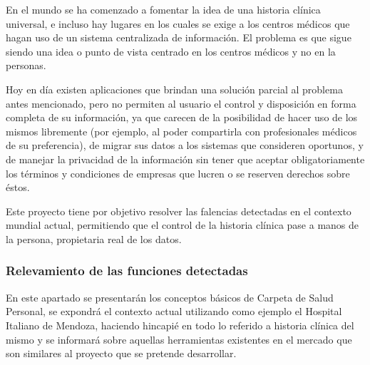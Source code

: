 En el mundo se ha comenzado a fomentar la idea de una historia clínica universal, e incluso hay lugares en los cuales se exige a los centros médicos que hagan uso de un sistema centralizada de  información.
El problema es que sigue siendo una idea o punto de vista centrado en los centros médicos y no en la personas.

Hoy en día existen aplicaciones que brindan una solución parcial al problema antes mencionado, pero no permiten al usuario el control y disposición en forma completa de su información, ya que carecen de la posibilidad de hacer uso de los mismos libremente (por ejemplo, al poder compartirla con profesionales médicos de su preferencia), de migrar sus datos a los sistemas que consideren oportunos, y de manejar la privacidad de la información sin tener que aceptar obligatoriamente los términos y condiciones de empresas que lucren o se reserven derechos sobre éstos.

Este proyecto tiene por objetivo resolver las falencias detectadas en el contexto mundial actual, permitiendo que el control de la historia clínica pase a manos de la persona, propietaria real de los datos.


\subsubsection{Relevamiento de las funciones detectadas}
En este apartado se presentarán los conceptos básicos de Carpeta de Salud Personal, se expondrá el contexto actual utilizando como ejemplo el Hospital Italiano de Mendoza, haciendo hincapié en todo lo referido a historia clínica del mismo y se informará sobre aquellas herramientas existentes en el mercado que son similares al proyecto que se pretende desarrollar.

